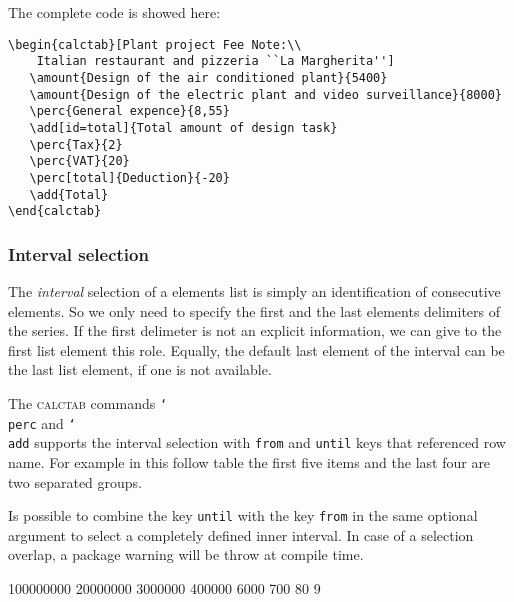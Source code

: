 \documentclass[a4paper]{article}
\newcommand{\ct}{\textsc{calctab}} %
\newcommand{\cmd}[1]{\texttt{\char`\\#1}}
\begin{document}
\begin{calctab}
\end{calctab}

The complete code is showed here:

\begin{Verbatim}
\begin{calctab}[Plant project Fee Note:\\
	Italian restaurant and pizzeria ``La Margherita'']
   \amount{Design of the air conditioned plant}{5400}
   \amount{Design of the electric plant and video surveillance}{8000}
   \perc{General expence}{8,55}
   \add[id=total]{Total amount of design task}
   \perc{Tax}{2}
   \perc{VAT}{20}
   \perc[total]{Deduction}{-20}
   \add{Total}
\end{calctab}
\end{Verbatim}

\subsubsection{Interval selection}
The \emph{interval} selection of a elements list is simply an identification of consecutive elements. So we only need to specify the first and the last elements delimiters of the series. If the first delimeter is not an explicit information, we can give to the first list element this role. Equally, the default last element of the interval can be the last list element, if one is not available.

The \ct{} commands \cmd{perc} and \cmd{add} supports the interval selection with \texttt{from} and \texttt{until} keys that referenced row name. For example in this follow table the first five items and the last four are two separated groups.

Is possible to combine the key \texttt{until} with the key \texttt{from} in the same optional argument to select a completely defined inner interval.
In case of a selection overlap, a package warning will be throw at compile time.

\begin{calctab}
      	  {100000000}
      	  {20000000}
    	  {3000000}
     	  {400000}
    \inrule
      {6000}
            {700}
            {80}
             {9}
\end{calctab}
\end{document}
